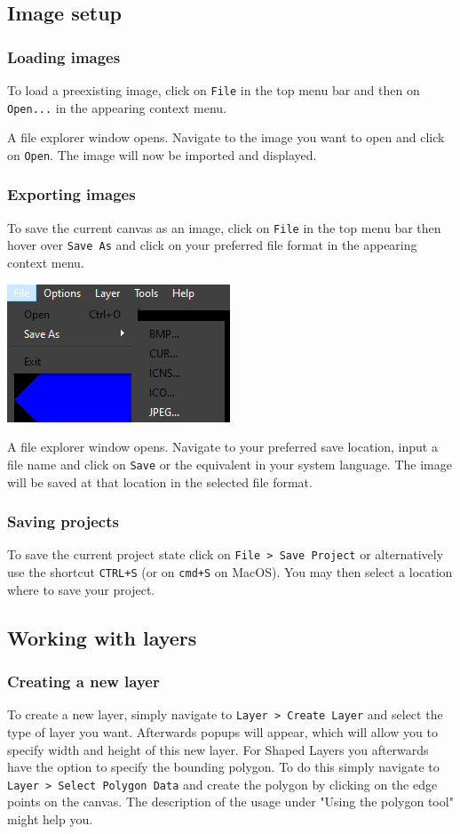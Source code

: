 \documentclass[a4paper, 12pt]{article}
\begin{document}
\subsection{Image setup}
\subsubsection{Loading images}
To load a preexisting image, click on \texttt{File} in the top menu bar and then on \texttt{Open...} in the appearing context menu.

A file explorer window opens. Navigate to the image you want to open and click on \texttt{Open}. The image will now be imported and displayed.

\subsubsection{Exporting images}
To save the current canvas as an image, click on \texttt{File} in the top menu bar then hover over \texttt{Save As} and click on your preferred file format in the appearing context menu.
\begin{center}
\includegraphics[width=0.3\linewidth,keepaspectratio]{assets/file-save}
\end{center}

A file explorer window opens. Navigate to your preferred save location, input a file name and click on \texttt{Save} or the equivalent in your system language. The image will be saved at that location in the selected file format.

\subsubsection{Saving projects}
To save the current project state click on \texttt{File > Save Project} or alternatively use the shortcut \texttt{CTRL+S} (or on \texttt{cmd+S} on MacOS). You may then select a location where to save your project.

\subsection{Working with layers}
\subsubsection{Creating a new layer}
To create a new layer, simply navigate to \texttt{Layer > Create Layer} and select the type of layer you want. Afterwards popups will appear, which will allow you to specify width and height of this new layer.
For Shaped Layers you afterwards have the option to specify the bounding polygon. To do this simply navigate to \texttt{Layer > Select Polygon Data} and create the polygon by clicking on the edge points on the canvas. The description of the usage under "Using the polygon tool" might help you.
\end{document}
